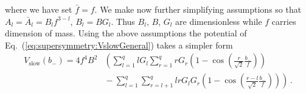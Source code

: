 \documentclass[12pt]{article}
\begin{document}
where we have set $\bar f = f$.
We make now further simplifying assumptions so that $A_l = \bar A_l = B_l f^{3 - l}$, $B_l = B G_l$.
Thus $B_l$, $B$, $G_l$ are dimensionless while $f$ carries dimension of mass.
Using the above assumptions the potential of Eq.~(\ref{eq:supersymmetry:VslowGeneral}) takes a simpler form
\begin{equation} \label{eq:supersymmetry:Vslow}
  \begin{aligned}
    V_\text{slow}\left(b_-\right) = 4 f^4 B^2 &\left(
      \sum_{l = 1}^q l G_l \sum_{r = 1}^q r G_r
        \left(1 - \cos\left(\frac{r}{\sqrt{2}} \frac{b_-}{f}\right)\right)\right. \\
      &\left.{} - \sum_{l = 1}^q \sum_{r = l + 1}^q l r G_l G_r
        \left(1 - \cos\left(\frac{r - l}{\sqrt{2}} \frac{b_-}{f}\right)\right)
    \right)\,.
  \end{aligned}
\end{equation}

\end{document}

